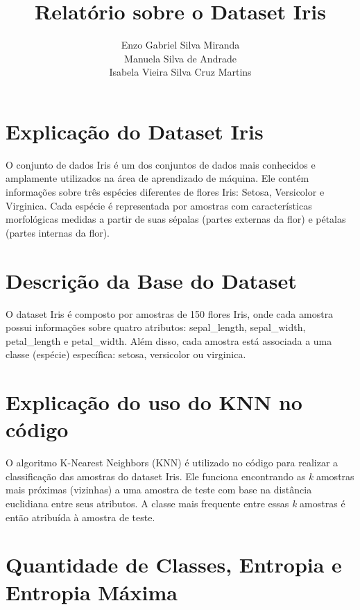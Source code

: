 \documentclass{article}
\begin{document}
\title{Relatório sobre o Dataset Iris}
\author{
  \begin{tabular}{c}
    Enzo Gabriel Silva Miranda \\
    Manuela Silva de Andrade \\
    Isabela Vieira Silva Cruz Martins \\
  \end{tabular}
}

\maketitle

\section{Explicação do Dataset Iris}

O conjunto de dados Iris é um dos conjuntos de dados mais conhecidos e amplamente utilizados na área de aprendizado de máquina. Ele contém informações sobre três espécies diferentes de flores Iris: Setosa, Versicolor e Virginica. Cada espécie é representada por amostras com características morfológicas medidas a partir de suas sépalas (partes externas da flor) e pétalas (partes internas da flor).

\section{Descrição da Base do Dataset}

O dataset Iris é composto por amostras de 150 flores Iris, onde cada amostra possui informações sobre quatro atributos: sepal\_length, sepal\_width, petal\_length e petal\_width. Além disso, cada amostra está associada a uma classe (espécie) específica: setosa, versicolor ou virginica.

\section{Explicação do uso do KNN no código}

O algoritmo K-Nearest Neighbors (KNN) é utilizado no código para realizar a classificação das amostras do dataset Iris. Ele funciona encontrando as \emph{k} amostras mais próximas (vizinhas) a uma amostra de teste com base na distância euclidiana entre seus atributos. A classe mais frequente entre essas \emph{k} amostras é então atribuída à amostra de teste.

\section{Quantidade de Classes, Entropia e Entropia Máxima}
\end{document}

